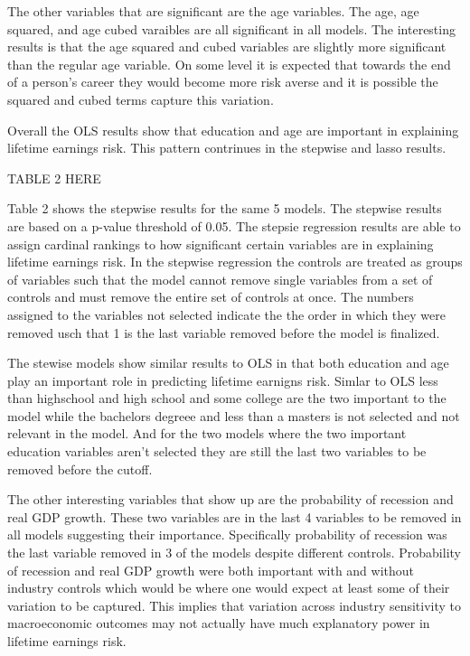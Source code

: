 \documentclass[12pt]{article}
\begin{document}

The other variables that are significant are the age variables. The age, age squared, and age cubed varaibles are all significant in all models. The interesting results is that the age squared and cubed variables are slightly more significant than the regular age variable. On some level it is expected that towards the end of a person's career they would become more risk averse and it is possible the squared and cubed terms capture this variation. 

Overall the OLS results show that education and age are important in explaining lifetime earnings risk. This pattern contrinues in the stepwise and lasso results.



TABLE 2 HERE


Table 2 shows the stepwise results for the same 5 models. The stepwise results are based on a p-value threshold of 0.05. The stepsie regression results are able to assign cardinal rankings to how significant certain variables are in explaining lifetime earnings risk. In the stepwise regression the controls are treated as groups of variables such that the model cannot remove single variables from a set of controls and must remove the entire set of controls at once. The numbers assigned to the variables not selected indicate the the order in which they were removed usch that 1 is the last variable removed before the model is finalized.

The stewise models show similar results to OLS in that both education and age play an important role in predicting lifetime earnigns risk. Simlar to OLS less than highschool and high school and some college are the two important to the model while the bachelors degreee and less than a masters is not selected and not relevant in the model. And for the two models where the two important education variables aren't selected they are still the last two variables to be removed before the cutoff. 


The other interesting variables that show up are the probability of recession and real GDP growth. These two variables are in the last 4 variables to be removed in all models suggesting their importance. Specifically probability of recession was the last variable removed in 3 of the models despite different controls. Probability of recession and real GDP growth were both important with and without industry controls which would be where one would expect at least some of their variation to be captured. This implies that variation across industry sensitivity to macroeconomic outcomes may not actually have much explanatory power in lifetime earnings risk.
\end{document}
